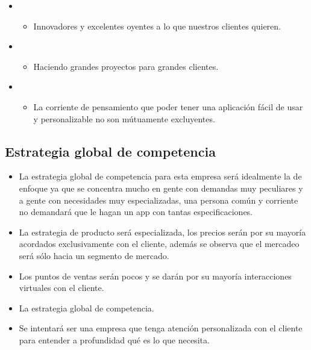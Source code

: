 \documentclass{article}
\begin{document}
\begin{itemize}
\begin{itemize}
            \item {} 
                \begin{itemize}
                    \item Innovadores y excelentes oyentes a lo que nuestros clientes quieren.
                \end{itemize}
                
            \item {} 
                \begin{itemize}
                    \item Haciendo grandes proyectos para grandes clientes.
                \end{itemize}
                
            \item {} 
                \begin{itemize}
                    \item La corriente de pensamiento que poder tener una aplicación fácil de usar y personalizable no son mútuamente excluyentes.
                \end{itemize}
        \end{itemize}
\end{itemize}


\subsection{Estrategia global de competencia}
\begin{itemize}
    \item La estrategia global de competencia para esta empresa será idealmente la de enfoque ya que se concentra mucho en gente con demandas muy peculiares y a gente con necesidades muy especializadas, una persona común y corriente no demandará que le hagan un app con tantas especificaciones.
    \item La estrategia de producto será especializada, los precios serán por su mayoría acordados exclusivamente con el cliente, además se observa que el mercadeo será sólo hacia un segmento de mercado. 
    \item Los puntos de ventas serán pocos y se darán por su mayoría interacciones virtuales con el cliente.
    \item La estrategia global de competencia.
    \item Se intentará ser una empresa que tenga atención personalizada con el cliente para entender a profundidad qué es lo que necesita.
\end{itemize}
\end{document}

